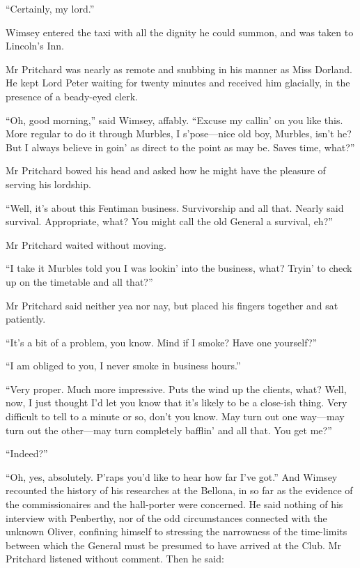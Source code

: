 \enquote{Certainly, my lord.}

Wimsey entered the taxi with all the dignity he could summon, and was taken to Lincoln's Inn.

Mr Pritchard was nearly as remote and snubbing in his manner as Miss Dorland. He kept Lord Peter waiting for twenty minutes and received him glacially, in the presence of a beady-eyed clerk.

\enquote{Oh, good morning,} said Wimsey, affably. \enquote{Excuse my callin' on you like this. More regular to do it through Murbles, I s'pose\allowbreak---\allowbreak nice old boy, Murbles, isn't he? But I always believe in goin' as direct to the point as may be. Saves time, what?}

Mr Pritchard bowed his head and asked how he might have the pleasure of serving his lordship.

\enquote{Well, it's about this Fentiman business. Survivorship and all that. Nearly said survival. Appropriate, what? You might call the old General a survival, eh?}

Mr Pritchard waited without moving.

\enquote{I take it Murbles told you I was lookin' into the business, what? Tryin' to check up on the timetable and all that?}

Mr Pritchard said neither yea nor nay, but placed his fingers together and sat patiently.

\enquote{It's a bit of a problem, you know. Mind if I smoke? Have one yourself?}

\enquote{I am obliged to you, I never smoke in business hours.}

\enquote{Very proper. Much more impressive. Puts the wind up the clients, what? Well, now, I just thought I'd let you know that it's likely to be a close-ish thing. Very difficult to tell to a minute or so, don't you know. May turn out one way\allowbreak---\allowbreak may turn out the other\allowbreak---\allowbreak may turn completely bafflin' and all that. You get me?}

\enquote{Indeed?}

\enquote{Oh, yes, absolutely. P'raps you'd like to hear how far I've got.} And Wimsey recounted the history of his researches at the Bellona, in so far as the evidence of the commissionaires and the hall-porter were concerned. He said nothing of his interview with Penberthy, nor of the odd circumstances connected with the unknown Oliver, confining himself to stressing the narrowness of the time-limits between which the General must be presumed to have arrived at the Club. Mr Pritchard listened without comment. Then he said:

